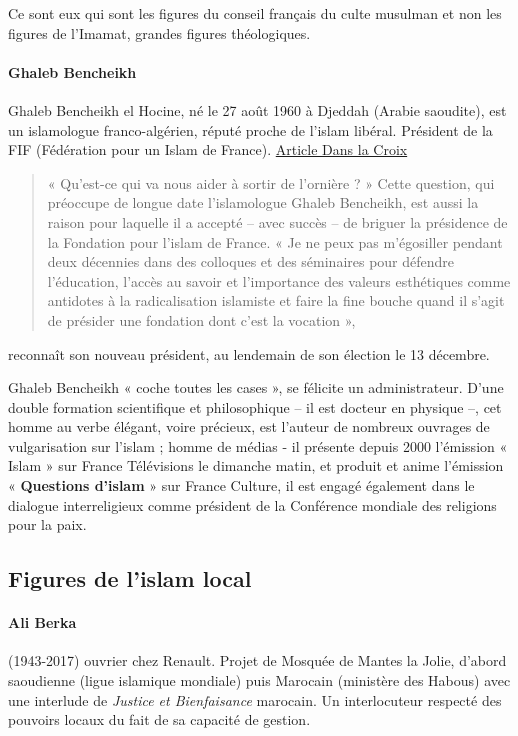     \begin{Synthesis}
Ce sont eux qui sont les figures du conseil français du culte musulman et non les figures de l'Imamat, grandes figures théologiques. 
    \end{Synthesis}
    
\paragraph{Ghaleb Bencheikh} \label{Theol:Bencheikh} Ghaleb Bencheikh el Hocine, né le 27 août 1960 à Djeddah (Arabie saoudite), est un islamologue franco-algérien, réputé proche de l'islam libéral. Président de la FIF (Fédération pour un Islam de France).
\href{https://www.la-croix.com/Religion/Islam/Ghaleb-Bencheikh-islamologue-croyant-tete-Fondation-lislam-France-2018-12-17-1200990189}{Article Dans la Croix} 
\begin{quote}
    « Qu’est-ce qui va nous aider à sortir de l’ornière ? » 
    Cette question, qui préoccupe de longue date l’islamologue Ghaleb Bencheikh, est aussi la raison pour laquelle il a accepté – avec succès – de briguer la présidence de la Fondation pour l’islam de France. « Je ne peux pas m’égosiller pendant deux décennies dans des colloques et des séminaires pour défendre l’éducation, l’accès au savoir et l’importance des valeurs esthétiques comme antidotes à la radicalisation islamiste et faire la fine bouche quand il s’agit de présider une fondation dont c’est la vocation »,
\end{quote}
 reconnaît son nouveau président, au lendemain de son élection le 13 décembre.

Ghaleb Bencheikh « coche toutes les cases », se félicite un administrateur. D’une double formation scientifique et philosophique – il est docteur en physique –, cet homme au verbe élégant, voire précieux, est l’auteur de nombreux ouvrages de vulgarisation sur l’islam ; homme de médias - il présente depuis 2000 l’émission « Islam » sur France Télévisions le dimanche matin, et produit et anime l’émission « \textbf{Questions d’islam} » sur France Culture, il est engagé également dans le dialogue interreligieux comme président de la Conférence mondiale des religions pour la paix.

\subsection{Figures de l’islam local}

\paragraph{Ali Berka} (1943-2017) ouvrier chez Renault. Projet de Mosquée de Mantes la Jolie, d'abord saoudienne (ligue islamique mondiale) puis Marocain (ministère des Habous) avec une interlude de \emph{Justice et Bienfaisance} marocain. Un interlocuteur respecté des pouvoirs locaux du fait de sa capacité de gestion.  
